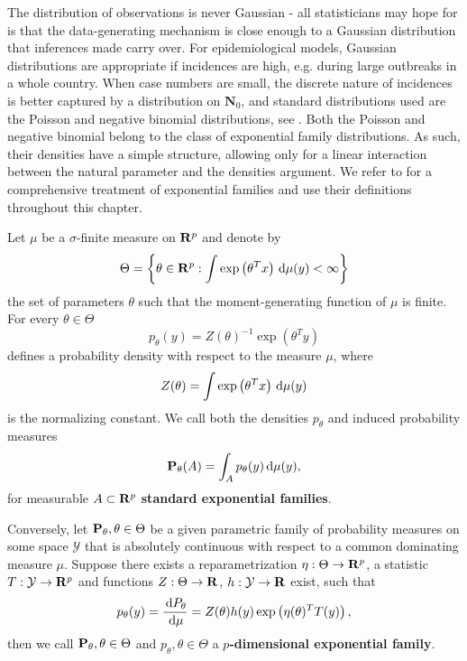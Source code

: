 The distribution of observations is never Gaussian - all statisticians may hope for is that the data-generating mechanism is close enough to a Gaussian distribution that inferences made carry over.
For epidemiological models, Gaussian distributions are appropriate if incidences are high, e.g. during large outbreaks in a whole country. 
When case numbers are small, the discrete nature of incidences is better captured by a distribution on $\mathbf N_{0}$, and standard distributions used are the Poisson and negative binomial distributions, see .
Both the Poisson and negative binomial belong to the class of exponential family distributions. As such, their densities have a simple structure, allowing only for a linear interaction between the natural parameter and the densities argument. We refer to \cite{Brown1986Fundamentals} for a comprehensive treatment of exponential families and use their definitions throughout this chapter.

\begin{definition}
    Let $\mu$ be a $\sigma$-finite measure on $\R^{p}$ and denote by 
    $$\Theta = \left\{\theta \in \R^{p} : \int \exp \left( \theta^{T} x \right) \d\mu(y) < \infty\right\}$$
    the set of parameters $\theta$ such that the moment-generating function of $\mu$ is finite. 
    For every $\theta \in \Theta$ $$p_{\theta}(y) = Z(\theta)^{-1} \exp (\theta^{T} y)$$ defines a probability density with respect to the measure $\mu$, where $$Z(\theta) = \int \exp \left( \theta^{T} x \right) \d\mu(y)$$ is the normalizing constant. 
    We call both the densities $p_{\theta}$ and induced probability measures $$ \P_{\theta} (A) = \int_{A} p_{\theta}(y) \d \mu(y),$$ for measurable $A \subset \R^{p}$ \textbf{standard exponential families}.

    Conversely, let $\P_{\theta}, \theta \in \Theta$ be a given parametric family of probability measures on some space $\mathcal Y$ that is absolutely continuous with respect to a common dominating measure $\mu$. Suppose there exists a reparametrization $\eta : \Theta \to \R^{p}$, a statistic $T: \mathcal Y \to \R^{p}$ and functions $Z: \Theta\to \R$, $h:\mathcal Y \to \R$ exist, such that
    $$
        p_{\theta}(y) = \frac{\d P_{\theta}}{\d \mu} = Z(\theta) h(y) \exp \left(\eta(\theta)^{T}T(y)\right),
    $$
    then we call $\P_{\theta}, \theta \in \Theta$ and $p_{\theta}, \theta \in \Theta$ a \textbf{$p$-dimensional exponential family}.
\end{definition}

